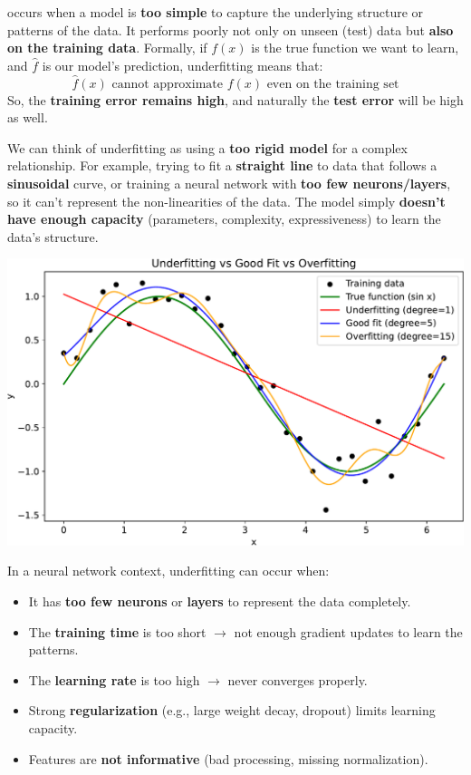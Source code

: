 \begin{remarkbox}\label{rmk:underfitting}
     occurs when a model is \textbf{too simple} to capture the underlying structure or patterns of the data. It performs poorly not only on unseen (test) data but \textbf{also on the training data}. Formally, if $f(x)$ is the true function we want to learn, and $\hat{f}$ is our model's prediction, underfitting means that:
    \begin{equation*}
        \hat{f}(x) \text{ cannot approximate } f(x) \text{ even on the training set}
    \end{equation*}
    So, the \textbf{training error remains high}, and naturally the \textbf{test error} will be high as well.

    \highspace
    We can think of underfitting as using a \textbf{too rigid model} for a complex relationship. For example, trying to fit a \textbf{straight line} to data that follows a \textbf{sinusoidal} curve, or training a neural network with \textbf{too few neurons/layers}, so it can't represent the non-linearities of the data. The model simply \textbf{doesn't have enough capacity} (parameters, complexity, expressiveness) to learn the data's structure.

    \begin{center}
        \includegraphics[width=\textwidth]{img/neural-networks-and-overfitting/underfitting-vs-overfitting.pdf}
    \end{center}

    \highspace
    \textcolor{Red2}{} In a neural network context, underfitting can occur when:
    \begin{itemize}
        \item It has \textbf{too few neurons} or \textbf{layers} to represent the data completely.
        \item The \textbf{training time} is too short $\to$ not enough gradient updates to learn the patterns.
        \item The \textbf{learning rate} is too high $\to$ never converges properly.
        \item Strong \textbf{regularization} (e.g., large weight decay, dropout) limits learning capacity.
        \item Features are \textbf{not informative} (bad processing, missing normalization).
    \end{itemize}
\end{remarkbox}